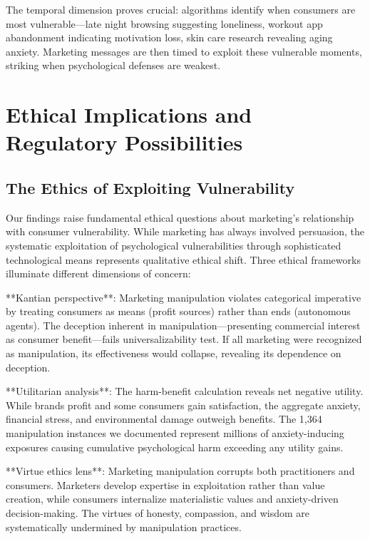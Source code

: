 The temporal dimension proves crucial: algorithms identify when consumers are most vulnerable—late night browsing suggesting loneliness, workout app abandonment indicating motivation loss, skin care research revealing aging anxiety. Marketing messages are then timed to exploit these vulnerable moments, striking when psychological defenses are weakest.

\section{Ethical Implications and Regulatory Possibilities}
\label{sec:ethics_regulation}

\subsection{The Ethics of Exploiting Vulnerability}

Our findings raise fundamental ethical questions about marketing's relationship with consumer vulnerability. While marketing has always involved persuasion, the systematic exploitation of psychological vulnerabilities through sophisticated technological means represents qualitative ethical shift. Three ethical frameworks illuminate different dimensions of concern:

**Kantian perspective**: Marketing manipulation violates categorical imperative by treating consumers as means (profit sources) rather than ends (autonomous agents). The deception inherent in manipulation—presenting commercial interest as consumer benefit—fails universalizability test. If all marketing were recognized as manipulation, its effectiveness would collapse, revealing its dependence on deception.

**Utilitarian analysis**: The harm-benefit calculation reveals net negative utility. While brands profit and some consumers gain satisfaction, the aggregate anxiety, financial stress, and environmental damage outweigh benefits. The 1,364 manipulation instances we documented represent millions of anxiety-inducing exposures causing cumulative psychological harm exceeding any utility gains.

**Virtue ethics lens**: Marketing manipulation corrupts both practitioners and consumers. Marketers develop expertise in exploitation rather than value creation, while consumers internalize materialistic values and anxiety-driven decision-making. The virtues of honesty, compassion, and wisdom are systematically undermined by manipulation practices.

